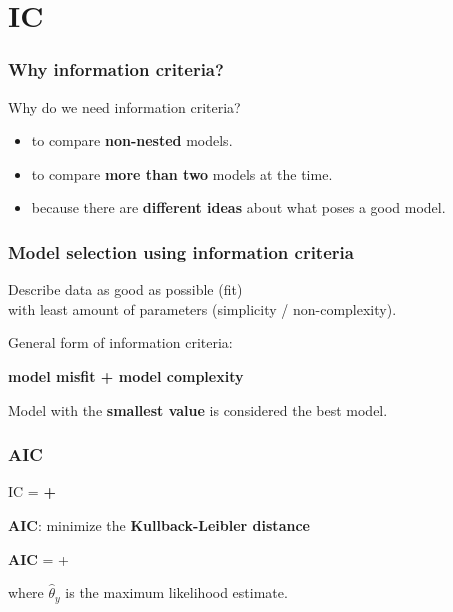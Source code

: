 \documentclass[10pt]{beamer}\usepackage[]{graphicx}\usepackage[]{xcolor}
\begin{document}
\section{IC}
%
%
\begin{frame}
	\frametitle{Why information criteria?}
	Why do we need information criteria?
	\begin{itemize}
		\item to compare \textbf{non-nested} models.
		\item to compare \textbf{more than two} models at the time.
		\item because there are \textbf{different ideas} about what poses a good model.
	\end{itemize}
	
\end{frame}
%
\begin{frame}
	\frametitle{Model selection using information criteria}
	
	Describe data as good as possible (fit) \\
	with least amount of parameters (simplicity / non-complexity).
	
	\bigskip
	
	\begin{block}{General form of information criteria:}
		\bigskip
		{\centerline{
				\textbf{model misfit + model complexity}}
		}
	\end{block}

	\bigskip
	Model with the \textbf{smallest value} is considered the best model.
\end{frame}
%
\begin{frame}
	\frametitle{AIC}
	
	\centerline{	IC = \textbf{{\color{orange}{model misfit}} + {\color{purple}{model complexity}}}}
	\vspace{.5 cm}
	
	{\textbf{AIC}: minimize the \textbf{Kullback-Leibler distance}}

	\vspace{1cm}
	\centerline{{\textbf{AIC} ={} + \color{purple}{$2 p$}}}
	
	\vspace{.5 cm}
	where $\hat{\theta}_y$ is the maximum likelihood estimate.
	
\end{frame}
\end{document}
